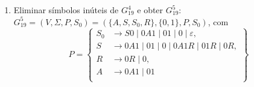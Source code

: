 \documentclass[12pt]{article}
\def\myling{{19}} %
\newcommand{\ve}{\ensuremath{\varepsilon}}
\begin{document}
\begin{tcolorbox}[breakable,rounded corners, colback=yellow!5, colframe=red!40!black, title={Transformações em $G_{\myling}$.}]
\begin{enumerate}
\[     \begin{aligned}
      S_0 & \to S0\mid 0A1 \mid 01 \mid 0 \mid \ve,\\
      S & \to 0A1 \mid 01 \mid 0 \mid 0A1R \mid 01R \mid 0R, \\
      R & \to 0R \mid 0, \\
      A & \to 0A1 \mid 01 \\
     \end{aligned}
    \right\}\]
  \item Eliminar símbolos inúteis de $G_{\myling}^4$ e obter $G_{\myling}^5$:\\
  $G_{\myling}^5=(V,\Sigma,P,S_0)=(\{A,S,S_0,R\},\{0,1\},P,S_0)$, com
    \[P=\left\{
     \begin{aligned}
      S_0 & \to S0\mid 0A1 \mid 01 \mid 0 \mid \ve,\\
      S & \to 0A1 \mid 01 \mid 0 \mid 0A1R \mid 01R \mid 0R, \\
      R & \to 0R \mid 0, \\
      A & \to 0A1 \mid 01 \\
     \end{aligned}
    \right\}\]
\end{enumerate}
\end{tcolorbox}
\end{document}
